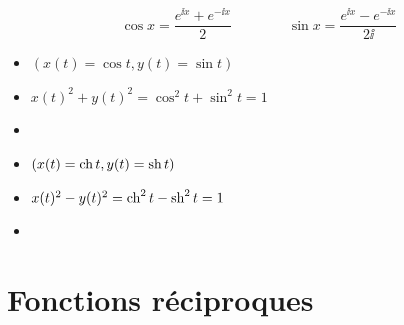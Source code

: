 \begin{frame}
\vspace*{-1ex}
$$\cos x = \frac{e^{\ii x} + e^{-\ii x}}{2} \qquad\qquad \sin x = \frac{e^{\ii x} - e^{-\ii x}}{2\ii}$$
\pause
\vspace*{-3ex}
\vspace*{-2ex}
\pause
\begin{minipage}{0.49\textwidth}
\small
\begin{itemize}
  \item $(x(t) = \cos t,y(t) = \sin t)$
  \pause
  \item $x(t)^2+y(t)^2 = \cos^2 t + \sin^2 t =1$
  \pause
  \item {}
\end{itemize}
\end{minipage}
\pause
\begin{minipage}{0.49\textwidth}
\small
\begin{itemize}  
  \item $(x(t) = \mathop{\text{ch}}\nolimits t, y(t) = \mathop{\text{sh}}\nolimits t)$
  \pause\pause
  \item $x(t)^2 - y(t)^2 = \mathop{\text{ch}}\nolimits^2 t - \mathop{\text{sh}}\nolimits^2 t = 1$
  \pause
  \item {}
\end{itemize}

\end{minipage}

\end{frame}


\section{Fonctions réciproques}

